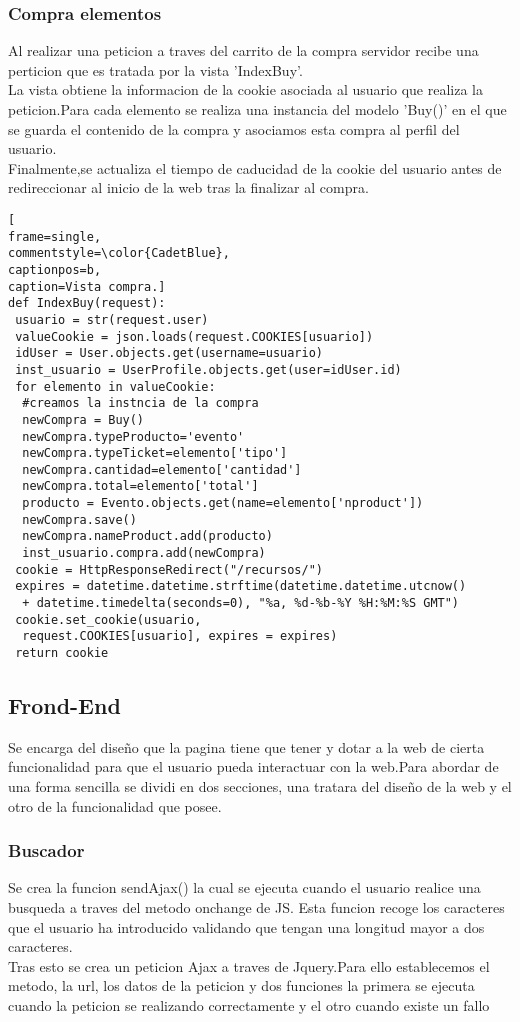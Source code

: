 \subsubsection*{Compra elementos}
Al realizar una peticion a traves del carrito de la compra  servidor recibe una perticion que es tratada por la vista 'IndexBuy'.
\\La vista obtiene la informacion de la cookie asociada al usuario que realiza la peticion.Para cada elemento se realiza una instancia del modelo 'Buy()' en el que se guarda el contenido de la compra y asociamos esta compra al perfil del usuario.
\\Finalmente,se actualiza el tiempo de caducidad de la cookie del usuario antes de redireccionar al inicio de la web tras la finalizar al compra.
\\
\begin{lstlisting}[
frame=single,
commentstyle=\color{CadetBlue},
captionpos=b,
caption=Vista compra.]
def IndexBuy(request):
 usuario = str(request.user)
 valueCookie = json.loads(request.COOKIES[usuario])
 idUser = User.objects.get(username=usuario)
 inst_usuario = UserProfile.objects.get(user=idUser.id)
 for elemento in valueCookie:
  #creamos la instncia de la compra
  newCompra = Buy()
  newCompra.typeProducto='evento'
  newCompra.typeTicket=elemento['tipo']
  newCompra.cantidad=elemento['cantidad']
  newCompra.total=elemento['total']
  producto = Evento.objects.get(name=elemento['nproduct'])
  newCompra.save()
  newCompra.nameProduct.add(producto)
  inst_usuario.compra.add(newCompra)
 cookie = HttpResponseRedirect("/recursos/")
 expires = datetime.datetime.strftime(datetime.datetime.utcnow()
  + datetime.timedelta(seconds=0), "%a, %d-%b-%Y %H:%M:%S GMT")
 cookie.set_cookie(usuario,
  request.COOKIES[usuario], expires = expires)
 return cookie
\end{lstlisting}  
\subsection{Frond-End}
Se encarga del diseño que la pagina tiene que tener y dotar a la web de cierta funcionalidad para que el usuario pueda interactuar con la web.Para abordar de una forma sencilla se dividi en dos secciones, una tratara del diseño  de la web y el otro de la funcionalidad que posee. 
\subsubsection*{Buscador}
Se crea la funcion sendAjax() la cual se ejecuta cuando el usuario realice una busqueda a traves del metodo onchange de JS. Esta funcion recoge los caracteres que el usuario ha introducido validando que tengan una longitud mayor a dos caracteres.
\\Tras esto se crea un peticion Ajax a traves de Jquery.Para ello establecemos el metodo, la url, los datos de la peticion y dos funciones la primera se ejecuta cuando la peticion se realizando correctamente y el otro cuando existe un fallo
